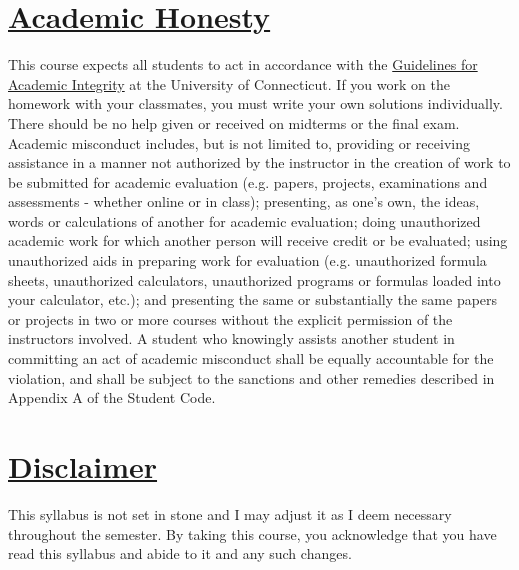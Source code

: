\documentclass[11pt]{article}
\begin{document}
\section*{\underline{Academic Honesty}}
This course expects all students to act in accordance with the \href{http://community.uconn.edu/the-student-code-appendix-a/}{Guidelines for Academic Integrity} at the University of Connecticut.  If you work on the homework with your classmates, you must write your own solutions individually. There should be no help given or received on midterms or the final exam. Academic misconduct includes, but is not limited to, providing or receiving assistance in a manner not authorized by the instructor in the creation of work to be submitted for academic evaluation (e.g. papers, projects, examinations and assessments - whether online or in class); presenting, as one's own, the ideas, words or calculations of another for academic evaluation; doing unauthorized academic work for which another person will receive credit or be evaluated; using unauthorized aids in preparing work for evaluation (e.g. unauthorized formula sheets, unauthorized calculators, unauthorized programs or formulas loaded into your calculator, etc.); and presenting the same or substantially the same papers or projects in two or more courses without the explicit permission of the instructors involved. A student who knowingly assists another student in committing an act of academic misconduct shall be equally accountable for the violation, and shall be subject to the sanctions and other remedies described in Appendix A of the Student Code. 

\section*{\underline{Disclaimer}}
This syllabus is not set in stone and I may adjust it as I deem necessary throughout
the semester. By taking this course, you acknowledge that you have read this syllabus and abide
to it and any such changes.
\end{document}
